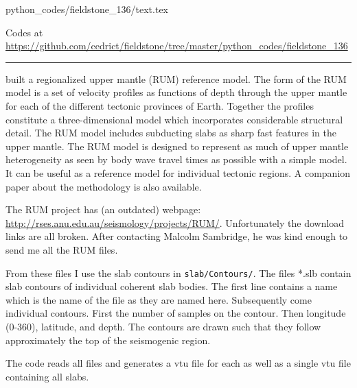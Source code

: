 \begin{flushright} {\tiny {\color{gray} python\_codes/fieldstone\_136/text.tex}} \end{flushright}

%

\begin{center}
\inpython Codes at \url{https://github.com/cedrict/fieldstone/tree/master/python_codes/fieldstone_136}
\end{center}

\par\noindent\rule{\textwidth}{0.4pt}

\textcite{gusa98} built a regionalized upper mantle (RUM) reference model.
The form of the RUM model is a set of velocity
profiles as functions of depth through the upper mantle for each of the different
tectonic provinces of Earth. Together the profiles constitute a three-dimensional
model which incorporates considerable structural detail.
The RUM model includes subducting slabs as sharp fast features in the
upper mantle. The RUM model is designed
to represent as much of upper mantle heterogeneity as seen by body wave travel
times as possible with a simple model. It can be useful as a reference model for
individual tectonic regions. 
A companion paper \parencite{sagu98} about the methodology is also available.

The RUM project has (an outdated) webpage: \url{http://rses.anu.edu.au/seismology/projects/RUM/}.
Unfortunately the download links are all broken. 
After contacting Malcolm Sambridge, he was kind enough to send me all the RUM files. 

From these files I use the slab contours in {\tt slab/Contours/}. 
The files *.slb contain slab contours of individual coherent slab bodies.
The first line contains a name which is the name of the file as they are
named here.  Subsequently come individual contours.  First the number of
samples on the contour.  Then longitude (0-360), latitude, and depth.
The contours are drawn such that they follow approximately the top of
the seismogenic region.

The code reads all files and generates a vtu file for each as well
as a single vtu file containing all slabs. 

